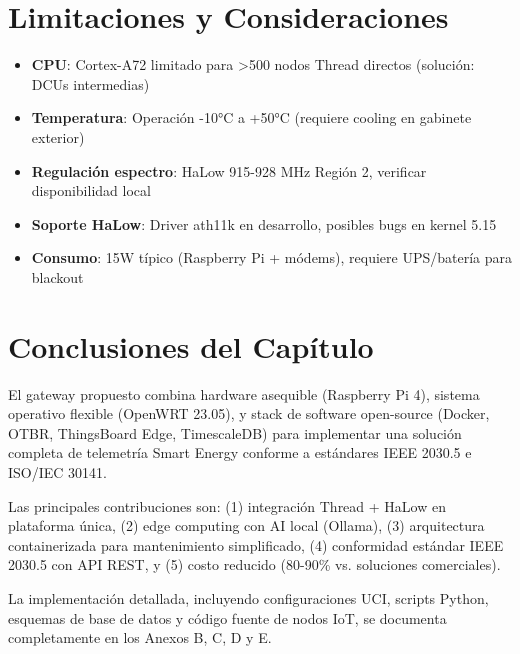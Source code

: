 \section{Limitaciones y Consideraciones}

\begin{itemize}
    \item \textbf{CPU}: Cortex-A72 limitado para >500 nodos Thread directos (solución: DCUs intermedias)
    \item \textbf{Temperatura}: Operación -10°C a +50°C (requiere cooling en gabinete exterior)
    \item \textbf{Regulación espectro}: HaLow 915-928 MHz Región 2, verificar disponibilidad local
    \item \textbf{Soporte HaLow}: Driver ath11k en desarrollo, posibles bugs en kernel 5.15
    \item \textbf{Consumo}: 15W típico (Raspberry Pi + módems), requiere UPS/batería para blackout
\end{itemize}

\section{Conclusiones del Capítulo}

El gateway propuesto combina hardware asequible (Raspberry Pi 4), sistema operativo flexible (OpenWRT 23.05), y stack de software open-source (Docker, OTBR, ThingsBoard Edge, TimescaleDB) para implementar una solución completa de telemetría Smart Energy conforme a estándares IEEE 2030.5 e ISO/IEC 30141.

Las principales contribuciones son: (1) integración Thread + HaLow en plataforma única, (2) edge computing con AI local (Ollama), (3) arquitectura containerizada para mantenimiento simplificado, (4) conformidad estándar IEEE 2030.5 con API REST, y (5) costo reducido (80-90\% vs. soluciones comerciales).

La implementación detallada, incluyendo configuraciones UCI, scripts Python, esquemas de base de datos y código fuente de nodos IoT, se documenta completamente en los Anexos B, C, D y E.

